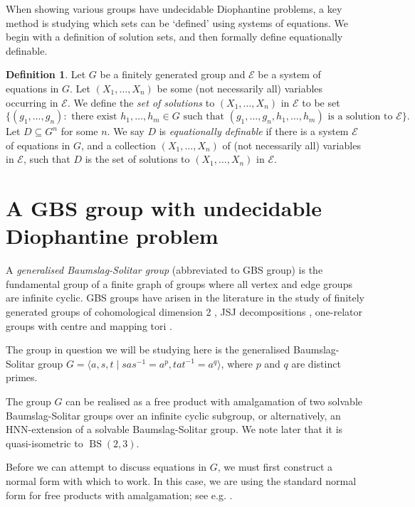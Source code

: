 \documentclass[11pt]{amsart}
\theoremstyle{definition}
\newtheorem{dfn}[theorem]{Definition}
\numberwithin{theorem}{section}
\DeclareMathOperator{\BS}{BS}
\begin{document}
When showing various groups have undecidable Diophantine problems, a
	key method is studying which sets can be `defined' using systems of
	equations. We begin with a definition of solution sets, and then
	formally define equationally definable.
    \begin{dfn}
        Let \(G\) be a finitely generated group and \(\mathcal E\) be a
        system of equations in \(G\). Let \((X_1, \ldots, X_n)\) be
		some 
        (not necessarily all) variables occurring in
		\(\mathcal E\). We define the \emph{set of solutions} to
        \((X_1, \ldots, X_n)\) in \(\mathcal E\) to be set
        \[
        \{(g_1, \ldots, g_n) : \textrm{ there exist } h_1, \ldots, h_m
                \in G \textrm{ such that } (g_1, \ldots, g_n, h_1, \ldots, h_m)
\text{ is a solution to } \mathcal E\}.\]
	Let \(D \subseteq G^n\) for some $n$. We say \(D\) is \emph{equationally
	definable} if there is a system \(\mathcal E\) of equations in \(G\),
	and a collection \((X_1, \ldots, X_n)\) of (not necessarily all) variables
	in \(\mathcal E\), such that \(D\) is the set of solutions to
	\((X_1, \ldots, X_n)\) in \(\mathcal E\). 
	\end{dfn}

\section{A GBS group with undecidable Diophantine problem}
A \emph{generalised Baumslag-Solitar group} (abbreviated to GBS group) is the fundamental group of a finite graph of groups where all vertex and edge groups are infinite cyclic. 
GBS groups have arisen in the literature in the study of finitely generated groups of cohomological dimension 2 \cite{Kropholler1990}, JSJ decompositions \cite{Kropholler1993}, one-relator groups with centre \cite{Collins1977, McCool1991, Pietrowski1974} and mapping tori \cite{levitt2015generalized}.

	The group in question we will be studying here is the generalised
	Baumslag-Solitar group \(G = \langle a, s, t \mid sas^{-1} = a^p, tat^{-1}
	= a^q \rangle\), where \(p\) and \(q\) are distinct primes. 

The group \(G\) can be realised as a free product with amalgamation of two solvable Baumslag-Solitar groups over an infinite cyclic subgroup, or alternatively, an HNN-extension of a solvable Baumslag-Solitar group.  We note later that it is quasi-isometric to \(\BS(2, 3)\).

Before we can attempt to discuss equations in \(G\), we must first construct a normal form with which to work. In this case, we are using the standard normal form for free products with amalgamation; see e.g. \cite[Chapter IV]{lyndon1977combinatorial}.
\end{document}
